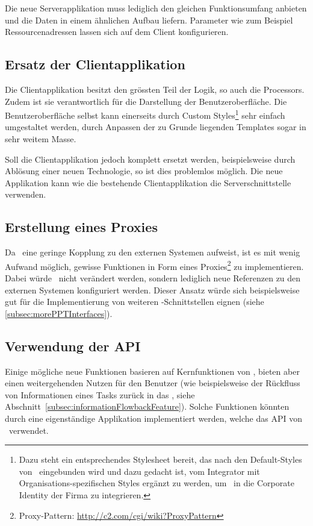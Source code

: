 			Die neue Serverapplikation muss lediglich den gleichen Funktionsumfang anbieten und die Daten in einem ähnlichen Aufbau liefern.
			Parameter wie zum Beispiel Ressourcenadressen lassen sich auf dem Client konfigurieren. 
	
		\subsection{Ersatz der Clientapplikation}
			Die Clientapplikation besitzt den grössten Teil der Logik, so auch die Processors.
			Zudem ist sie verantwortlich für die Darstellung der Benutzeroberfläche.
			Die Benutzeroberfläche selbst kann einerseits durch Custom Styles\footnote{Dazu steht ein entsprechendes Stylesheet bereit, das nach den Default-Styles von \eeppi\ eingebunden wird und dazu gedacht ist, vom Integrator mit Organisations-spezifischen Styles ergänzt zu werden, um \eeppi\ in die Corporate Identity der Firma zu integrieren.} sehr einfach umgestaltet werden, durch Anpassen der zu Grunde liegenden Templates sogar in sehr weitem Masse.
			
			Soll die Clientapplikation jedoch komplett ersetzt werden, beispielsweise durch Ablösung einer neuen Technologie, so ist dies problemlos möglich.
			Die neue Applikation kann wie die bestehende Clientapplikation die Serverschnittstelle verwenden.
			

		\subsection{Erstellung eines Proxies}
			Da \eeppi\ eine geringe Kopplung zu den externen Systemen aufweist,
			 ist es mit wenig Aufwand möglich,
			gewisse Funktionen in Form eines Proxies\footnote{Proxy-Pattern: \url{http://c2.com/cgi/wiki?ProxyPattern}} zu implementieren.
			Dabei würde \eeppi\ nicht verändert werden,
			sondern lediglich neue Referenzen zu den externen Systemen konfiguriert werden.
			Dieser Ansatz würde sich beispielsweise gut für die Implementierung von weiteren \ppt-Schnittstellen eignen (siehe \ref{subsec:morePPTInterfaces}).
			
		\subsection{Verwendung der API}
			Einige mögliche neue Funktionen basieren auf Kernfunktionen von \eeppi,
			bieten aber einen weitergehenden Nutzen für den Benutzer
			(wie beispielsweise der Rückfluss von Informationen eines Tasks zurück in das \ttpl, siehe Abschnitt~\ref{subsec:informationFlowbackFeature}).
			Solche Funktionen könnten durch eine eigenständige Applikation implementiert werden,
			welche das API von \eeppi\ verwendet.



